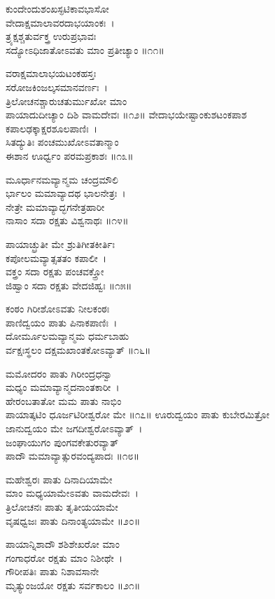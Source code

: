 ಕುಂದೇಂದುಶಂಖಸ್ಫಟಿಕಾವಭಾಸೋ\\ವೇದಾಕ್ಷಮಾಲಾವರದಾಭಯಾಂಕಃ~।\\
ತ್ರ್ಯಕ್ಷಶ್ಚತುರ್ವಕ್ತ್ರ ಉರುಪ್ರಭಾವಃ\\ಸದ್ಯೋಽಧಿಜಾತೋಽವತು ಮಾಂ ಪ್ರತೀಚ್ಯಾಂ ॥೧೧॥

 ವರಾಕ್ಷಮಾಲಾಭಯಟಂಕಹಸ್ತಃ\\ಸರೋಜಕಿಂಜಲ್ಕಸಮಾನವರ್ಣಃ~।\\
ತ್ರಿಲೋಚನಶ್ಚಾರುಚತುರ್ಮುಖೋ ಮಾಂ\\ಪಾಯಾದುದೀಚ್ಯಾಂ ದಿಶಿ ವಾಮದೇವಃ ॥೧೨॥
\newpage
ವೇದಾಭಯೇಷ್ಟಾಂಕುಶಟಂಕಪಾಶ\\ಕಪಾಲಢಕ್ಕಾಕ್ಷರಶೂಲಪಾಣಿಃ~।\\
ಸಿತದ್ಯುತಿಃ ಪಂಚಮುಖೋಽವತಾನ್ಮಾಂ\\ಈಶಾನ ಊರ್ಧ್ವಂ ಪರಮಪ್ರಕಾಶಃ ॥೧೩॥

ಮೂರ್ಧಾನಮವ್ಯಾನ್ಮಮ ಚಂದ್ರಮೌಲಿ\\ರ್ಭಾಲಂ ಮಮಾವ್ಯಾದಥ ಭಾಲನೇತ್ರಃ~।\\
ನೇತ್ರೇ ಮಮಾವ್ಯಾದ್ಭಗನೇತ್ರಹಾರೀ\\ನಾಸಾಂ ಸದಾ ರಕ್ಷತು ವಿಶ್ವನಾಥಃ ॥೧೪॥

ಪಾಯಾಚ್ಛ್ರುತೀ ಮೇ ಶ್ರುತಿಗೀತಕೀರ್ತಿಃ\\ಕಪೋಲಮವ್ಯಾತ್ಸತತಂ ಕಪಾಲೀ~।\\
ವಕ್ತ್ರಂ ಸದಾ ರಕ್ಷತು ಪಂಚವಕ್ತ್ರೋ\\ಜಿಹ್ವಾಂ ಸದಾ ರಕ್ಷತು ವೇದಜಿಹ್ವಃ ॥೧೫॥

ಕಂಠಂ ಗಿರೀಶೋಽವತು ನೀಲಕಂಠಃ\\ಪಾಣಿದ್ವಯಂ ಪಾತು ಪಿನಾಕಪಾಣಿಃ~।\\
ದೋರ್ಮೂಲಮವ್ಯಾನ್ಮಮ ಧರ್ಮಬಾಹು\\ರ್ವಕ್ಷಃಸ್ಥಲಂ ದಕ್ಷಮಖಾಂತಕೋಽವ್ಯಾತ್ ॥೧೬॥

ಮಮೋದರಂ ಪಾತು ಗಿರೀಂದ್ರಧನ್ವಾ\\ಮಧ್ಯಂ ಮಮಾವ್ಯಾನ್ಮದನಾಂತಕಾರೀ~।\\
ಹೇರಂಬತಾತೋ ಮಮ ಪಾತು ನಾಭಿಂ\\ಪಾಯಾತ್ಕಟಿಂ ಧೂರ್ಜಟಿರೀಶ್ವರೋ ಮೇ ॥೧೭॥
\newpage
ಊರುದ್ವಯಂ ಪಾತು ಕುಬೇರಮಿತ್ರೋ\\ಜಾನುದ್ವಯಂ ಮೇ ಜಗದೀಶ್ವರೋಽವ್ಯಾತ್~।\\
ಜಂಘಾಯುಗಂ ಪುಂಗವಕೇತುರವ್ಯಾತ್\\ಪಾದೌ ಮಮಾವ್ಯಾತ್ಸುರವಂದ್ಯಪಾದಃ ॥೧೮॥

ಮಹೇಶ್ವರಃ ಪಾತು ದಿನಾದಿಯಾಮೇ\\ಮಾಂ ಮಧ್ಯಯಾಮೇಽವತು ವಾಮದೇವಃ~।\\
ತ್ರಿಲೋಚನಃ ಪಾತು ತೃತೀಯಯಾಮೇ\\ವೃಷಧ್ವಜಃ ಪಾತು ದಿನಾಂತ್ಯಯಾಮೇ ॥೨೦॥

ಪಾಯಾನ್ನಿಶಾದೌ ಶಶಿಶೇಖರೋ ಮಾಂ\\ಗಂಗಾಧರೋ ರಕ್ಷತು ಮಾಂ ನಿಶೀಥೇ~।\\
ಗೌರೀಪತಿಃ ಪಾತು ನಿಶಾವಸಾನೇ\\ಮೃತ್ಯುಂಜಯೋ ರಕ್ಷತು ಸರ್ವಕಾಲಂ ॥೨೧॥

